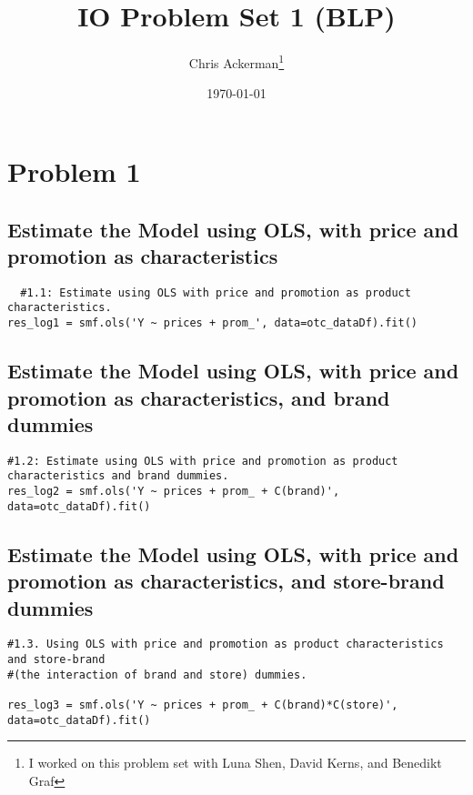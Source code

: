 \documentclass[dvipsnames]{article}
\title{IO Problem Set 1 (BLP)}
\author{Chris Ackerman\thanks{I worked on this problem set with Luna Shen, David Kerns, and Benedikt Graf}}
\date{\today}
\begin{document}
\maketitle
\section*{Problem 1}
\subsection*{Estimate the Model using OLS, with price and promotion as characteristics}

\begin{verbatim}
  #1.1: Estimate using OLS with price and promotion as product characteristics.
res_log1 = smf.ols('Y ~ prices + prom_', data=otc_dataDf).fit()
\end{verbatim}
\begin{table}[htp]
  \centering
  
\end{table}
\newpage

\subsection*{Estimate the Model using OLS, with price and promotion as characteristics, and brand dummies}

\begin{verbatim}
#1.2: Estimate using OLS with price and promotion as product characteristics and brand dummies.
res_log2 = smf.ols('Y ~ prices + prom_ + C(brand)', data=otc_dataDf).fit()
  \end{verbatim}
\begin{table}[htp]
  \centering
  
  \end{table}
  \newpage

\subsection*{Estimate the Model using OLS, with price and promotion as characteristics, and store-brand dummies}
\begin{verbatim}
#1.3. Using OLS with price and promotion as product characteristics and store-brand 
#(the interaction of brand and store) dummies.

res_log3 = smf.ols('Y ~ prices + prom_ + C(brand)*C(store)', data=otc_dataDf).fit()
  \end{verbatim}
\begin{table}[htp]
  \centering
  
  \end{table}
  \newpage
\end{document}
